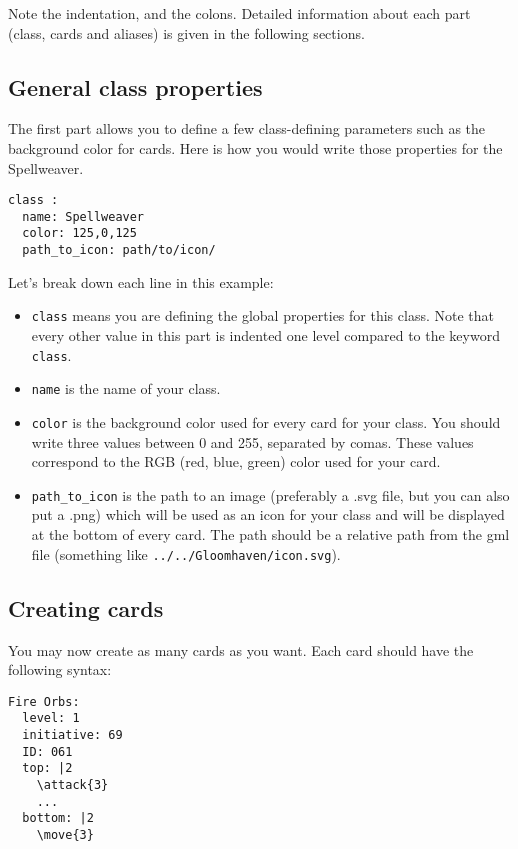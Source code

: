 \documentclass{article}
\begin{document}
Note the indentation, and the colons. Detailed information about each part (class, cards and aliases) is given in the following sections.

\subsection{General class properties}
The first part allows you to define a few class-defining parameters such as the background color for cards. Here is how you would write those properties for the Spellweaver.
\begin{center}
\begin{BVerbatim}
class :
  name: Spellweaver
  color: 125,0,125
  path_to_icon: path/to/icon/
\end{BVerbatim}
\end{center}
Let's break down each line in this example:
\begin{itemize}
	\item \verb`class` means you are defining the global properties for this class. Note that every other value in this part is indented one level compared to the keyword \verb`class`.
	\item \verb`name` is the name of your class.
	\item \verb`color` is the background color used for every card for your class. You should write three values between 0 and 255, separated by comas. These values correspond to the RGB (red, blue, green) color used for your card.
	\item \verb`path_to_icon` is the path to an image (preferably a .svg file, but you can also put a .png) which will be used as an icon for your class and will be displayed at the bottom of every card. The path should be a relative path from the gml file (something like \verb`../../Gloomhaven/icon.svg`).
\end{itemize}

\subsection{Creating cards}
You may now create as many cards as you want. Each card should have the following syntax:
\begin{center}
\begin{BVerbatim}
Fire Orbs:
  level: 1
  initiative: 69
  ID: 061
  top: |2
    \attack{3}
    ...
  bottom: |2
    \move{3}
\end{BVerbatim}
\end{center}
\end{document}

